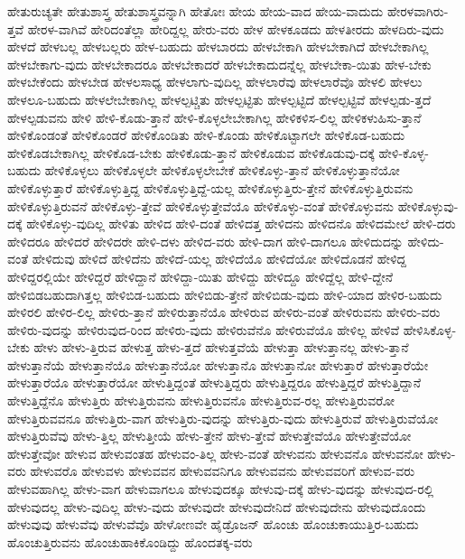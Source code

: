 {ಹೇತುರುಚ್ಯತೇ
ಹೇತುಶಾಸ್ತ್ರ
ಹೇತುಶಾಸ್ತ್ರವನ್ನಾಗಿ
ಹೇತೋಃ
ಹೇಯ
ಹೇಯ-ವಾದ
ಹೇಯ-ವಾದುದು
ಹೇರಳವಾಗಿರು-ತ್ತವೆ
ಹೇರಳ-ವಾಗಿವೆ
ಹೇರಿದಂತೆಲ್ಲಾ
ಹೇರಿದ್ದಲ್ಲ
ಹೇರು-ವರು
ಹೇಳ
ಹೇಳಕೂಡದು
ಹೇಳತೀರದು
ಹೇಳದಿರು-ವುದು
ಹೇಳದೆ
ಹೇಳಬಲ್ಲ
ಹೇಳಬಲ್ಲರು
ಹೇಳ-ಬಹುದು
ಹೇಳಬಾರದು
ಹೇಳಬೇಕಾಗಿ
ಹೇಳಬೇಕಾಗಿದೆ
ಹೇಳಬೇಕಾಗಿಲ್ಲ
ಹೇಳಬೇಕಾಗು-ವುದು
ಹೇಳಬೇಕಾದರೂ
ಹೇಳಬೇಕಾದರೆ
ಹೇಳಬೇಕಾದುದನ್ನೆಲ್ಲ
ಹೇಳಬೇಕಾ-ಯಿತು
ಹೇಳ-ಬೇಕು
ಹೇಳಬೇಕೆಂದು
ಹೇಳಬೇಡ
ಹೇಳಲಸಾಧ್ಯ
ಹೇಳಲಾಗು-ವುದಿಲ್ಲ
ಹೇಳಲಾರೆವು
ಹೇಳಲಾರೆವೊ
ಹೇಳಲಿ
ಹೇಳಲು
ಹೇಳಲೂ-ಬಹುದು
ಹೇಳಲೇಬೇಕಾಗಿಲ್ಲ
ಹೇಳಲ್ಪಟ್ಚಿತು
ಹೇಳಲ್ಪಟ್ಟಿತು
ಹೇಳಲ್ಪಟ್ಟಿದೆ
ಹೇಳಲ್ಪಟ್ಟಿವೆ
ಹೇಳಲ್ಪಡು-ತ್ತದೆ
ಹೇಳಲ್ಪಡುವನು
ಹೇಳಿ
ಹೇಳಿ-ಕೊಡು-ತ್ತಾನೆ
ಹೇಳಿ-ಕೊಳ್ಳಲೇಬೇಕಾಗಿಲ್ಲ
ಹೇಳಿಕಳಿಸ-ಲಿಲ್ಲ
ಹೇಳಿಕಳುಹಿಸು-ತ್ತಾನೆ
ಹೇಳಿಕೊಂಡಂತೆ
ಹೇಳಿಕೊಂಡರೆ
ಹೇಳಿಕೊಂಡಿತು
ಹೇಳಿ-ಕೊಂಡು
ಹೇಳಿಕೊಟ್ಟಾಗಲೇ
ಹೇಳಿಕೊಡ-ಬಹುದು
ಹೇಳಿಕೊಡಬೇಕಾಗಿಲ್ಲ
ಹೇಳಿಕೊಡ-ಬೇಕು
ಹೇಳಿಕೊಡು-ತ್ತಾನೆ
ಹೇಳಿಕೊಡುವ
ಹೇಳಿಕೊಡುವು-ದಕ್ಕೆ
ಹೇಳಿ-ಕೊಳ್ಳ-ಬಹುದು
ಹೇಳಿಕೊಳ್ಳಲು
ಹೇಳಿಕೊಳ್ಳಲೇ
ಹೇಳಿಕೊಳ್ಳಲೇಬೇಕೆ
ಹೇಳಿಕೊಳ್ಳು-ತ್ತಾನೆ
ಹೇಳಿಕೊಳ್ಳುತ್ತಾನೆಯೋ
ಹೇಳಿಕೊಳ್ಳುತ್ತಾರೆ
ಹೇಳಿಕೊಳ್ಳುತ್ತಿದ್ದ
ಹೇಳಿಕೊಳ್ಳುತ್ತಿದ್ದೆ-ಯಲ್ಲ
ಹೇಳಿಕೊಳ್ಳುತ್ತಿರು-ತ್ತೇನೆ
ಹೇಳಿಕೊಳ್ಳುತ್ತಿರುವನು
ಹೇಳಿಕೊಳ್ಳುತ್ತಿರುವನೆ
ಹೇಳಿಕೊಳ್ಳು-ತ್ತೇವೆ
ಹೇಳಿಕೊಳ್ಳುತ್ತೇವೆಯೊ
ಹೇಳಿಕೊಳ್ಳು-ವಂತೆ
ಹೇಳಿಕೊಳ್ಳುವನು
ಹೇಳಿಕೊಳ್ಳುವು-ದಕ್ಕೆ
ಹೇಳಿಕೊಳ್ಳು-ವುದಿಲ್ಲ
ಹೇಳಿತು
ಹೇಳಿದ
ಹೇಳಿ-ದಂತೆ
ಹೇಳಿದತ್ತ
ಹೇಳಿದನು
ಹೇಳಿದನೊ
ಹೇಳಿದಮೇಲೆ
ಹೇಳಿ-ದರು
ಹೇಳಿದರೂ
ಹೇಳಿದರೆ
ಹೇಳಿದರೇ
ಹೇಳಿ-ದಳು
ಹೇಳಿದ-ವರು
ಹೇಳಿ-ದಾಗ
ಹೇಳಿ-ದಾಗಲೂ
ಹೇಳಿದುದನ್ನು
ಹೇಳಿದು-ವಂತೆ
ಹೇಳಿದುವು
ಹೇಳಿದೆ
ಹೇಳಿದೆನು
ಹೇಳಿದೆ-ಯಲ್ಲ
ಹೇಳಿದೆಯೊ
ಹೇಳಿದೆಯೋ
ಹೇಳಿದೊಡನೆ
ಹೇಳಿದ್ದ
ಹೇಳಿದ್ದರಲ್ಲಿಯೇ
ಹೇಳಿದ್ದರೆ
ಹೇಳಿದ್ದಾನೆ
ಹೇಳಿದ್ದಾ-ಯಿತು
ಹೇಳಿದ್ದು
ಹೇಳಿದ್ದೂ
ಹೇಳಿದ್ದೆಲ್ಲ
ಹೇಳಿ-ದ್ದೇನೆ
ಹೇಳಿಬಿಡಬಹುದಾಗಿತ್ತಲ್ಲ
ಹೇಳಿಬಿಡ-ಬಹುದು
ಹೇಳಿಬಿಡು-ತ್ತೇನೆ
ಹೇಳಿಬಿಡು-ವುದು
ಹೇಳಿ-ಯಾದ
ಹೇಳಿರ-ಬಹುದು
ಹೇಳಿರಲಿ
ಹೇಳಿರ-ಲಿಲ್ಲ
ಹೇಳಿರು-ತ್ತಾನೆ
ಹೇಳಿರುತ್ತಾನೆಯೊ
ಹೇಳಿರುವ
ಹೇಳಿರು-ವಂತೆ
ಹೇಳಿರುವನು
ಹೇಳಿರು-ವರು
ಹೇಳಿರು-ವುದನ್ನು
ಹೇಳಿರುವುದ-ರಿಂದ
ಹೇಳಿರು-ವುದು
ಹೇಳಿರುವೆನೊ
ಹೇಳಿರುವೆಯೊ
ಹೇಳಿಲ್ಲ
ಹೇಳಿವೆ
ಹೇಳಿಸಿಕೊಳ್ಳ-ಬೇಕು
ಹೇಳು
ಹೇಳು-ತ್ತಿರುವ
ಹೇಳುತ್ತ
ಹೇಳು-ತ್ತದೆ
ಹೇಳುತ್ತವೆಯೆ
ಹೇಳುತ್ತಾ
ಹೇಳುತ್ತಾನಲ್ಲ
ಹೇಳು-ತ್ತಾನೆ
ಹೇಳುತ್ತಾನೆಯೆ
ಹೇಳುತ್ತಾನೆಯೊ
ಹೇಳುತ್ತಾನೆಯೋ
ಹೇಳುತ್ತಾನೊ
ಹೇಳುತ್ತಾನೋ
ಹೇಳುತ್ತಾರೆ
ಹೇಳುತ್ತಾರೆಯೇ
ಹೇಳುತ್ತಾರೆಯೊ
ಹೇಳುತ್ತಾರೆಯೋ
ಹೇಳುತ್ತಿದ್ದಂತೆ
ಹೇಳುತ್ತಿದ್ದರು
ಹೇಳುತ್ತಿದ್ದರೂ
ಹೇಳುತ್ತಿದ್ದರೆ
ಹೇಳುತ್ತಿದ್ದಾನೆ
ಹೇಳುತ್ತಿದ್ದೆನೊ
ಹೇಳುತ್ತಿರು
ಹೇಳುತ್ತಿರುವನು
ಹೇಳುತ್ತಿರುವನೊ
ಹೇಳುತ್ತಿರುವ-ರಲ್ಲ
ಹೇಳುತ್ತಿರುವರೋ
ಹೇಳುತ್ತಿರುವವನೂ
ಹೇಳುತ್ತಿರು-ವಾಗ
ಹೇಳುತ್ತಿರು-ವುದನ್ನು
ಹೇಳುತ್ತಿರು-ವುದು
ಹೇಳುತ್ತಿರುವೆ
ಹೇಳುತ್ತಿರುವೆಯೋ
ಹೇಳುತ್ತಿರುವೆವು
ಹೇಳು-ತ್ತಿಲ್ಲ
ಹೇಳುತ್ತೀಯೆ
ಹೇಳು-ತ್ತೇನೆ
ಹೇಳು-ತ್ತೇವೆ
ಹೇಳುತ್ತೇವೆಯೊ
ಹೇಳುತ್ತೇವೆಯೋ
ಹೇಳುತ್ತೇವೋ
ಹೇಳುವ
ಹೇಳುವಂತಹ
ಹೇಳುವಂ-ತಿಲ್ಲ
ಹೇಳು-ವಂತೆ
ಹೇಳುವನು
ಹೇಳುವನೊ
ಹೇಳುವನೋ
ಹೇಳು-ವರು
ಹೇಳುವರೊ
ಹೇಳುವಳು
ಹೇಳುವವನ
ಹೇಳುವವನಿಗೂ
ಹೇಳುವವನು
ಹೇಳುವವರಿಗೆ
ಹೇಳುವ-ವರು
ಹೇಳುವಹಾಗಿಲ್ಲ
ಹೇಳು-ವಾಗ
ಹೇಳುವಾಗಲೂ
ಹೇಳುವುದಕ್ಕೂ
ಹೇಳುವು-ದಕ್ಕೆ
ಹೇಳು-ವುದನ್ನು
ಹೇಳುವುದ-ರಲ್ಲಿ
ಹೇಳುವುದಲ್ಲ
ಹೇಳು-ವುದಿಲ್ಲ
ಹೇಳು-ವುದು
ಹೇಳುವುದೇ
ಹೇಳುವುದೇನಿದೆ
ಹೇಳುವುದೇನು
ಹೇಳುವುದೊಂದು
ಹೇಳುವುವು
ಹೇಳುವೆವು
ಹೇಳುವೆವೊ
ಹೇಳೋಣವೇ
ಹೈಡ್ರೊಜನ್
ಹೊಂಚು
ಹೊಂಚುಕಾಯುತ್ತಿರ-ಬಹುದು
ಹೊಂಚುತ್ತಿರುವನು
ಹೊಂಚುಹಾಕಿಕೊಂಡಿದ್ದು
ಹೊಂದತಕ್ಕ-ವರು
}
